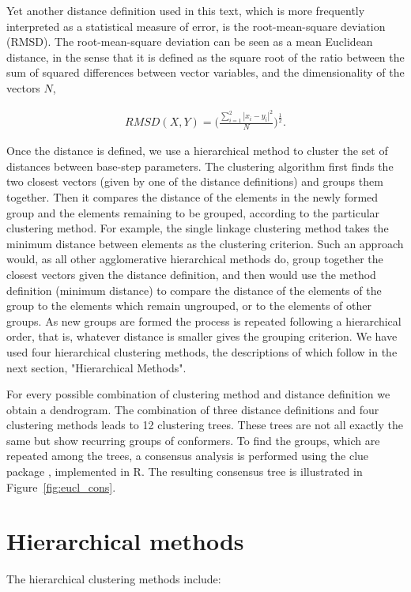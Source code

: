 Yet  another distance  definition used  in  this text,  which is  more
frequently  interpreted as  a  statistical measure  of  error, is  the
root-mean-square deviation (RMSD).  The root-mean-square deviation can
be seen as a mean Euclidean  distance, in the sense that it is defined
as the square root of the ratio between the sum of squared differences
between vector variables, and the dimensionality of the vectors $N$,

\begin{gather}
RMSD(X,Y)      =     \Big(      \frac{\sum_{i=1}^2     |x_i-y_i|^2}{N}
\Big)^\frac{1}{2} .\label{eq:rmsd}
\end{gather}

Once the distance is defined,  we use a hierarchical method to cluster
the  set of  distances between  base-step parameters.   The clustering
algorithm first  finds the  two closest vectors  (given by one  of the
distance definitions) and groups  them together.  Then it compares the
distance of  the elements in the  newly formed group  and the elements
remaining  to  be  grouped,  according to  the  particular  clustering
method.  For  example, the single linkage clustering  method takes the
minimum distance  between elements as the  clustering criterion.  Such
an approach would, as all other agglomerative hierarchical methods do,
group together the closest  vectors given the distance definition, and
then would use the method definition (minimum distance) to compare the
distance of  the elements  of the group  to the elements  which remain
ungrouped,  or to  the elements  of other  groups. As  new  groups are
formed the  process is repeated  following a hierarchical  order, that
is,  whatever distance is  smaller gives  the grouping  criterion.  We
have used  four hierarchical  clustering methods, the  descriptions of
which follow in the next section, "Hierarchical Methods".

For  every  possible combination  of  clustering  method and  distance
definition we  obtain a dendrogram. The combination  of three distance
definitions and four clustering  methods leads to 12 clustering trees.
These trees are not all exactly  the same but show recurring groups of
conformers.  To find the groups, which are repeated among the trees, a
consensus  analysis  is  performed  using  the  \textsf{clue}  package
\cite{hornik2005}, implemented in  \textsf{R}. The resulting consensus
tree is illustrated in Figure~\ref{fig:eucl_cons}.

\section{Hierarchical methods}
The hierarchical clustering methods include:

